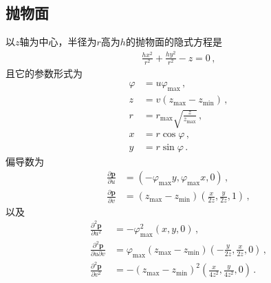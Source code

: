 \subsection{抛物面}\label{sub:抛物面}
以$z$轴为中心，半径为$r$高为$h$的抛物面的隐式方程是
\begin{align*}
    \frac{hx^2}{r^2}+\frac{hy^2}{r^2}-z=0\, ,
\end{align*}
且它的参数形式为
\begin{align*}
    \varphi & =u\varphi_{\max}\, ,                   \\
    z       & =v(z_{\max}-z_{\min})\, ,              \\
    r       & =r_{\max}\sqrt{\frac{z}{z_{\max}}}\, , \\
    x       & =r\cos\varphi\, ,                      \\
    y       & =r\sin\varphi\, .
\end{align*}
偏导数为
\begin{align*}
    \frac{\partial\bm p}{\partial u} & =(-\varphi_{\max}y,\varphi_{\max}x,0)\, ,                        \\
    \frac{\partial\bm p}{\partial v} & =(z_{\max}-z_{\min})\left(\frac{x}{2z},\frac{y}{2z},1\right)\, ,
\end{align*}
以及
\begin{align*}
    \frac{\partial^2\bm p}{\partial u^2}         & =-\varphi_{\max}^2(x,y,0)\, ,                                                   \\
    \frac{\partial^2\bm p}{\partial u\partial v} & =\varphi_{\max}(z_{\max}-z_{\min})\left(-\frac{y}{2z},\frac{x}{2z},0\right)\, , \\
    \frac{\partial^2\bm p}{\partial v^2}         & =-(z_{\max}-z_{\min})^2\left(\frac{x}{4z^2},\frac{y}{4z^2},0\right)\, .
\end{align*}

